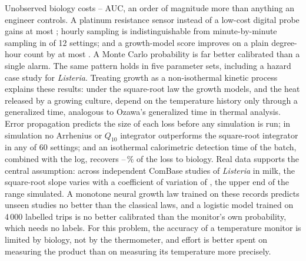 \documentclass[11pt,a4paper,twoside,openany]{book}
\theoremstyle{plain}\newtheorem{proposition}{Proposition}\newtheorem{corollary}{Corollary}
\theoremstyle{definition}\newtheorem{definition}{Definition}[chapter]
\begin{document}
Unobserved biology costs \NumBaseGapMin--\NumBaseGapMax{} AUC, an order of magnitude more than anything an engineer controls. A platinum resistance sensor instead of a low-cost digital probe gains at most \NumBaseSensMax; hourly sampling is indistinguishable from minute-by-minute sampling in \NumBaseSampNull{} of 12 settings; and a growth-model score improves on a plain degree-hour count by at most \NumLagGainMax. A Monte Carlo probability is far better calibrated than a single alarm. The same pattern holds in five parameter sets, including a hazard case study for \textit{Listeria}. Treating growth as a non-isothermal kinetic process explains these results: under the square-root law the growth models, and the heat released by a growing culture, depend on the temperature history only through a generalized time, analogous to Ozawa's generalized time in thermal analysis. Error propagation predicts the size of each loss before any simulation is run; in simulation no Arrhenius or $Q_{10}$ integrator outperforms the square-root integrator in any of 60 settings; and an isothermal calorimetric detection time of the batch, combined with the log, recovers \CalFracMin--\CalFracMax\,\% of the loss to biology. Real data supports the central assumption: across \GlCvStudies{} independent ComBase studies of \textit{Listeria} in milk, the square-root slope varies with a coefficient of variation of \GlCvB, the upper end of the range simulated. A monotone neural growth law trained on these records predicts unseen studies no better than the classical laws, and a logistic model trained on 4\,000 labelled trips is no better calibrated than the monitor's own probability, which needs no labels. For this problem, the accuracy of a temperature monitor is limited by biology, not by the thermometer, and effort is better spent on measuring the product than on measuring its temperature more precisely.
\end{document}
